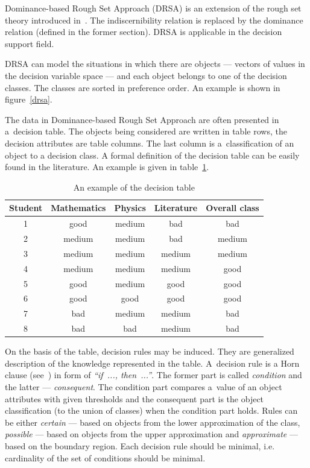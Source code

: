 Dominance-based Rough Set Approach (DRSA) is an extension of the rough set
theory introduced in~\cite{GMS01, GMS02, GMS05}. The indiscernibility relation
is replaced by the dominance relation (defined in the former section). DRSA is
applicable in the decision support field.

DRSA can model the situations in which there are objects --- vectors of values
in the decision variable space --- and each object belongs to one of the
decision classes. The classes are sorted in preference order. An example is
shown in figure~\ref{drsa}.

The data in Dominance-based Rough Set Approach are often presented in
a~decision table. The objects being considered are written in table rows, the
decision attributes are table columns. The last column is a~classification of
an object to a decision class. A formal definition of the decision table can
be easily found in the literature. An example is given in
table~\ref{t:dec_tab-example}.

\begin{table}
  \centering
  \begin{tabular}{c c c c | c}
   \hline
   Student & Mathematics & Physics & Literature & Overall class \\
   \hline
   \hline
   1 & good & medium & bad & bad \\
   2 & medium & medium & bad & medium \\
   3 & medium & medium & medium & medium \\
   4 & medium & medium & medium & good \\
   5 & good & medium & good & good \\
   6 & good & good & good & good \\
   7 & bad & medium & medium & bad \\
   8 & bad & bad & medium & bad \\
   \hline
  \end{tabular}
  \caption{An example of the decision table}
  \label{t:dec_tab-example}
\end{table}

On the basis of the table, decision rules may be induced. They are generalized
description of the knowledge represented in the table. A~decision rule is a
Horn clause (see~\cite{Hor51}) in form of \textit{``if~..., then~...''}. The
former part is called \textit{condition} and the latter ---
\textit{consequent}. The condition part compares a~value of an object
attributes with given thresholds and the consequent part is the object
classification (to the union of classes) when the condition part holds. Rules
can be either \textit{certain} --- based on objects from the lower
approximation of the class, \textit{possible} --- based on objects from the
upper approximation and \textit{approximate} --- based on the boundary
region. Each decision rule should be minimal, i.e. cardinality of the set of
conditions should be minimal.

